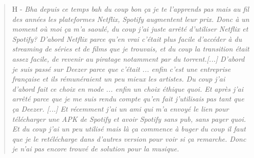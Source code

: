 \begin{quote}
    H - \textit{Bha depuis ce temps bah du coup bon ça je te l'apprends pas mais au fil des années les plateformes Netflix, Spotify augmentent leur prix. Donc à un moment où moi ça m'a saoulé, du coup j'ai juste arrêté d'utiliser Netflix et Spotify? D'abord Netflix parce qu'en vrai c'était plus facile d'accéder à du streaming de séries et de films que je trouvais, et du coup la transition était assez facile, de revenir au piratage notamment par du torrent.[...] D'abord je suis passé sur Deezer parce que c'était ... enfin c'est une entreprise française et ils rémunéraient un peu mieux les artistes. Du coup j'ai d'abord fait ce choix en mode ... enfin un choix éthique quoi. Et après j'ai arrêté parce que je me suis rendu compte qu'en fait j'utilisais pas tant que ça Deezer. [...] Et récemment j'ai un ami qui m'a envoyé le lien pour télécharger une APK de Spotify et avoir Spotify sans pub, sans payer quoi. Et du coup j'ai un peu utilisé mais là ça commence à buger du coup il faut que je le retélécharge dans d'autres version pour voir si ça remarche. Donc je n'ai pas encore trouvé de solution pour la musique.}
\end{quote}

